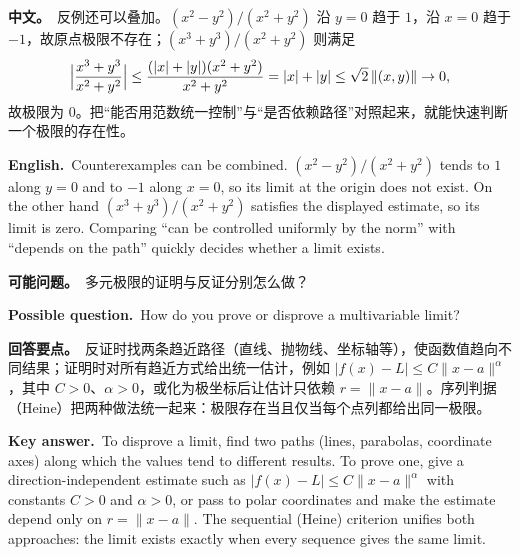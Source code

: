 \documentclass[UTF8,11pt,a4paper]{ctexart}
\newcommand{\BOTH}[2]{\par\noindent\textbf{中文。}\ #1\par\noindent\textbf{English.}\ #2\par}
\newcommand{\ASK}[4]{\begin{samepage}\par\noindent\textbf{可能问题。}\ #1\par\noindent\textbf{Possible question.}\ #2\par\noindent\textbf{回答要点。}\ #3\par\noindent\textbf{Key answer.}\ #4\medskip\end{samepage}}
\begin{document}
\BOTH{反例还可以叠加。$(x^2-y^2)/(x^2+y^2)$ 沿 $y=0$ 趋于 $1$，沿 $x=0$ 趋于 $-1$，故原点极限不存在；$(x^3+y^3)/(x^2+y^2)$ 则满足
\[
\Bigl|\frac{x^3+y^3}{x^2+y^2}\Bigr|\le\frac{(|x|+|y|)(x^2+y^2)}{x^2+y^2}=|x|+|y|\le\sqrt2\,\|(x,y)\|\to0,
\]
故极限为 $0$。把“能否用范数统一控制”与“是否依赖路径”对照起来，就能快速判断一个极限的存在性。}{Counterexamples can be combined. $(x^2-y^2)/(x^2+y^2)$ tends to $1$ along $y=0$ and to $-1$ along $x=0$, so its limit at the origin does not exist. On the other hand $(x^3+y^3)/(x^2+y^2)$ satisfies the displayed estimate, so its limit is zero. Comparing “can be controlled uniformly by the norm” with “depends on the path” quickly decides whether a limit exists.}
\ASK{多元极限的证明与反证分别怎么做？}{How do you prove or disprove a multivariable limit?}{反证时找两条趋近路径（直线、抛物线、坐标轴等），使函数值趋向不同结果；证明时对所有趋近方式给出统一估计，例如 $|f(x)-L|\le C\|x-a\|^\alpha$，其中 $C>0$、$\alpha>0$，或化为极坐标后让估计只依赖 $r=\|x-a\|$。序列判据（Heine）把两种做法统一起来：极限存在当且仅当每个点列都给出同一极限。}{To disprove a limit, find two paths (lines, parabolas, coordinate axes) along which the values tend to different results. To prove one, give a direction-independent estimate such as $|f(x)-L|\le C\|x-a\|^\alpha$ with constants $C>0$ and $\alpha>0$, or pass to polar coordinates and make the estimate depend only on $r=\|x-a\|$. The sequential (Heine) criterion unifies both approaches: the limit exists exactly when every sequence gives the same limit.}
\end{document}
